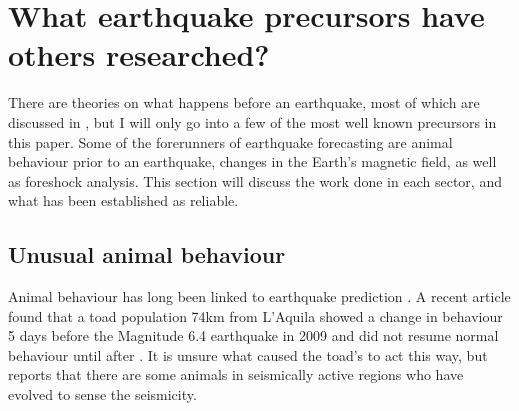 \documentclass[12pt]{report}
\begin{document}
\FloatBarrier

\section{What earthquake precursors have others researched?}

There are theories on what happens before an earthquake, most of which are discussed in \cite{Kagan1997}, but I will only go into a few of the most well known precursors in this paper. Some of the forerunners of earthquake forecasting are animal behaviour prior to an earthquake, changes in the Earth's magnetic field, as well as foreshock analysis.  This section will discuss the work done in each sector, and what has been established as reliable. 

\subsection{Unusual animal behaviour}
Animal behaviour has long been linked to earthquake prediction \citep{Logan1977,Lott1981}. A recent article found that a toad population 74km from L'Aquila showed a change in behaviour 5 days before the Magnitude 6.4 earthquake in 2009 and did not resume normal behaviour until after \citep{Grant2010}. It is unsure what caused the toad's to act this way, but \cite{Kirschvink2000} reports that there are some animals in seismically active regions who have evolved to sense the seismicity. 


\end{document}
